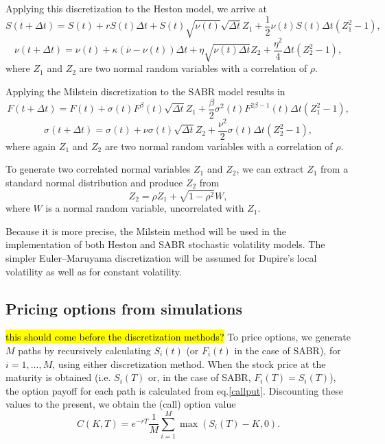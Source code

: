 Applying this discretization to the Heston model, we arrive at
\begin{equation}
S(t+\Delta t)=S(t)+rS(t)\Delta t+S(t)\sqrt{\nu(t)}\sqrt{\Delta t}Z_1+\frac{1}{2}\nu(t)S(t)\Delta t(Z_1^2-1),
\end{equation}
\begin{equation}
\nu(t+\Delta t)=\nu(t)+\kappa(\overline{\nu}-\nu(t))\Delta t+\eta\sqrt{\nu(t)\Delta t}Z_2+\frac{\eta^2}{4}\Delta t(Z_2^2-1),
\end{equation}
\noindent where $Z_1$ and $Z_2$ are two normal random variables with a correlation of $\rho$.


Applying the Milstein discretization to the SABR model results in
\begin{equation}
F(t+\Delta t)=F(t)+\sigma(t)F^\beta(t)\sqrt{\Delta t}Z_1+\frac{\beta}{2}\sigma^2(t)F^{2\beta-1}(t)\Delta t(Z_1^2-1),
\end{equation}
\begin{equation}
\sigma(t+\Delta t)=\sigma(t)+\nu\sigma(t)\sqrt{\Delta t}Z_2+\frac{\nu^2}{2}\sigma(t)\Delta t(Z_2^2-1),
\end{equation}
\noindent where again $Z_1$ and $Z_2$ are two normal random variables with a correlation of $\rho$.

To generate two correlated normal variables $Z_1$ and $Z_2$, we can extract $Z_1$ from a standard normal distribution and produce $Z_2$ from
\begin{equation}\label{normcorr}
Z_2=\rho Z_1+\sqrt{1-\rho^2}W,
\end{equation}
\noindent where $W$ is a normal random variable, uncorrelated with $Z_1$.

Because it is more precise, the Milstein method will be used in the implementation of both Heston and SABR stochastic volatility models. The simpler Euler–Maruyama discretization will be assumed for Dupire's local volatility as well as for constant volatility.


\subsection{Pricing options from simulations}
\hl{this should come before the discretization methods?}
To price options, we generate $M$ paths by recursively calculating $S_i(t)$ (or $F_i(t)$ in the case of SABR), for $i=1,\ldots,M$, using either discretization method. When the stock price at the maturity is obtained (i.e. $S_i(T)$ or, in the case of SABR, $F_i(T)=S_i(T)$), the option payoff for each path is calculated from eq.\eqref{callput}. Discounting these values to the present, we obtain the (call) option value
\begin{equation}
C(K,T)=e^{-rT}\frac{1}{M}\sum_{i=1}^M\max\left(S_i(T)-K,0\right).
\end{equation}

